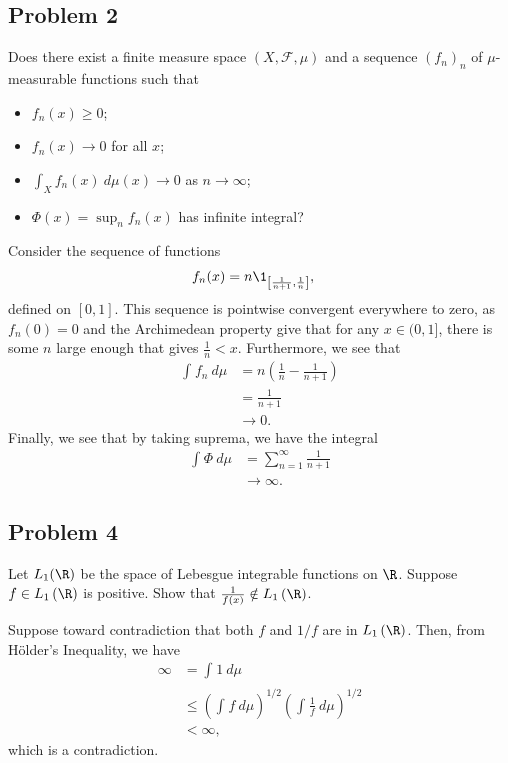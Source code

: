 \documentclass[10pt]{mypackage}
\begin{document}
\subsection{Problem 2}%
\begin{problem}
  Does there exist a finite measure space $\left( X,\mathcal{F},\mu \right)$ and a sequence $\left( f_n \right)_n$ of $\mu$-measurable functions such that
  \begin{itemize}
    \item $f_n(x) \geq 0$;
    \item $f_n(x)\rightarrow 0$ for all $x$;
    \item $ \int_{X}^{} f_n(x)\:d\mu(x) \rightarrow 0 $ as $n\rightarrow \infty$;
    \item $\Phi(x) = \sup_{n}f_n(x)$ has infinite integral?
  \end{itemize}
\end{problem}
Consider the sequence of functions
\begin{align*}
  f_n(x) &= n\1_{\left[ \frac{1}{n+1},\frac{1}{n} \right]},
\end{align*}
defined on $\left[ 0,1 \right]$. This sequence is pointwise convergent everywhere to zero, as $f_n(0) = 0$ and the Archimedean property give that for any $x\in (0,1]$, there is some $n$ large enough that gives $\frac{1}{n} < x$. Furthermore, we see that
\begin{align*}
  \int_{}^{} f_n\:d\mu &= n\left( \frac{1}{n}- \frac{1}{n+1} \right)\\
                       &= \frac{1}{n+1}\\
                       &\rightarrow 0.
\end{align*}
Finally, we see that by taking suprema, we have the integral
\begin{align*}
  \int_{}^{} \Phi\:d\mu &= \sum_{n=1}^{\infty}\frac{1}{n+1}\\
                        &\rightarrow \infty.
\end{align*}
\subsection{Problem 4}%
\begin{problem}
  Let $L_1(\R)$ be the space of Lebesgue integrable functions on $\R$. Suppose $f\in L_1\left( \R \right)$ is positive. Show that $\frac{1}{f(x)}\notin L_1\left( \R \right)$.
\end{problem}
Suppose toward contradiction that both $f$ and $1/f$ are in $L_1\left( \R \right)$. Then, from Hölder's Inequality, we have
\begin{align*}
  \infty &= \int_{}^{} 1\:d\mu\\
         &\leq \left( \int_{}^{} f\:d\mu \right)^{1/2} \left( \int_{}^{} \frac{1}{f}\:d\mu \right)^{1/2}\\
         &< \infty,
\end{align*}
which is a contradiction.
\end{document}
